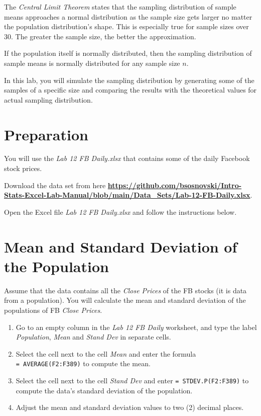 \documentclass[
]{book}
\providecommand{\tightlist}{%
  \setlength{\itemsep}{0pt}\setlength{\parskip}{0pt}}
\begin{document}
The \emph{Central Limit Theorem} states that the sampling distribution of sample means approaches a normal distribution as the sample size gets larger no matter the population distribution's shape. This is especially true for sample sizes over 30. The greater the sample size, the better the approximation.

If the population itself is normally distributed, then the sampling distribution of sample means is normally distributed for any sample size \(n\).

In this lab, you will simulate the sampling distribution by generating some of the samples of a specific size and comparing the results with the theoretical values for actual sampling distribution.

\hypertarget{preparation-8}{%
\section{Preparation}\label{preparation-8}}

You will use the \emph{Lab 12 FB Daily.xlsx} that contains some of the daily Facebook stock prices.

Download the data set from here \href{https://github.com/bsosnovski/Intro-Stats-Excel-Lab-Manual/blob/main/Data_Sets/Lab-12-FB-Daily.xlsx}{\textbf{https://github.com/bsosnovski/Intro-Stats-Excel-Lab-Manual/blob/main/Data\_Sets/Lab-12-FB-Daily.xlsx}}.

Open the Excel file \emph{Lab 12 FB Daily.xlsx} and follow the instructions below.

\hypertarget{mean-stdev-population}{%
\section{Mean and Standard Deviation of the Population}\label{mean-stdev-population}}

Assume that the data contains all the \emph{Close Prices} of the FB stocks (it is data from a population). You will calculate the mean and standard deviation of the populations of FB \emph{Close Prices}.

\begin{enumerate}
\def\labelenumi{\arabic{enumi}.}
\tightlist
\item
  Go to an empty column in the \emph{Lab 12 FB Daily} worksheet, and type the label \emph{Population}, \emph{Mean} and \emph{Stand Dev} in separate cells.
\item
  Select the cell next to the cell \emph{Mean} and enter the formula \texttt{=\ AVERAGE(F2:F389)} to compute the mean.
\item
  Select the cell next to the cell \emph{Stand Dev} and enter \texttt{=\ STDEV.P(F2:F389)} to compute the data's standard deviation of the population.
\item
  Adjust the mean and standard deviation values to two (2) decimal places.
\end{enumerate}
\end{document}
